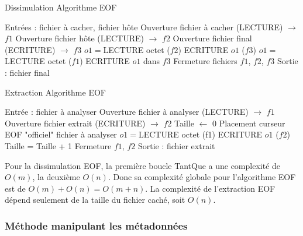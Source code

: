 \documentclass[11pt]{article}
\begin{document}
\begin{minipage}{.5\textwidth}
\begin{algorithm}[H]
\caption{Dissimulation Algorithme EOF}
\begin{algorithmic}
\color{green}
\STATE \footnotesize Entrées : fichier à cacher, fichier hôte
\color{black}
\STATE Ouverture fichier à cacher (LECTURE) $\rightarrow$ $f1$
\STATE Ouverture fichier hôte (LECTURE) $\rightarrow$ $f2$
\STATE Ouverture fichier final (ECRITURE) $\rightarrow$ $f3$
\STATE $o1 = $LECTURE octet ($f2$)
\STATE ECRITURE $o1$ ($f3$)
\ENDWHILE
{}
\STATE $o1 =$LECTURE octet ($f1$)
\STATE ECRITURE $o1$ dans $f3$
\ENDWHILE
\STATE Fermeture fichiers $f1$, $f2$, $f3$
\color{green}
\STATE Sortie : fichier final
\color{black}
\end{algorithmic}
\end{algorithm}
\normalsize
\end{minipage}
\begin{minipage}{.5\textwidth}
\begin{algorithm}[H]
\caption{Extraction Algorithme EOF}
\begin{algorithmic}
\color{green}
\STATE \footnotesize Entrée : fichier à analyser
\color{black}
\STATE Ouverture fichier à analyser (LECTURE) $\rightarrow$ $f1$
\STATE Ouverture fichier extrait (ECRITURE) $\rightarrow$ $f2$
\STATE Taille $\leftarrow$ 0
\STATE Placement curseur EOF "officiel" fichier à analyser
\STATE $o1 = $LECTURE octet (f1)
\STATE ECRITURE $o1$ ($f2$)
\STATE Taille = Taille + 1
\ENDWHILE
\STATE Fermeture $f1$, $f2$
\color{green}
\STATE Sortie : fichier extrait
\color{black}
\end{algorithmic}
\end{algorithm}
\normalsize
\end{minipage}

Pour la dissimulation EOF, la première boucle TantQue a une complexité de $O(m)$, 
la deuxième $O(n)$. \newline Donc sa complexité globale pour l'algorithme 
EOF est de $O(m)+O(n)=O(m+n)$. \newline
La complexité de l'extraction EOF dépend seulement de la taille du fichier 
caché, soit $O(n)$.

\subsubsection{Méthode manipulant les métadonnées}
\end{document}
